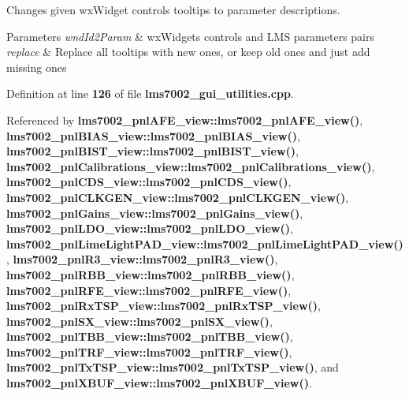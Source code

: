 Changes given wx\+Widget controls tooltips to parameter descriptions. 


\begin{DoxyParams}{Parameters}
{\em wnd\+Id2\+Param} & wx\+Widgets controls and L\+MS parameters pairs \\
\hline
{\em replace} & Replace all tooltips with new ones, or keep old ones and just add missing ones \\
\hline
\end{DoxyParams}


Definition at line {\bf 126} of file {\bf lms7002\+\_\+gui\+\_\+utilities.\+cpp}.



Referenced by {\bf lms7002\+\_\+pnl\+A\+F\+E\+\_\+view\+::lms7002\+\_\+pnl\+A\+F\+E\+\_\+view()}, {\bf lms7002\+\_\+pnl\+B\+I\+A\+S\+\_\+view\+::lms7002\+\_\+pnl\+B\+I\+A\+S\+\_\+view()}, {\bf lms7002\+\_\+pnl\+B\+I\+S\+T\+\_\+view\+::lms7002\+\_\+pnl\+B\+I\+S\+T\+\_\+view()}, {\bf lms7002\+\_\+pnl\+Calibrations\+\_\+view\+::lms7002\+\_\+pnl\+Calibrations\+\_\+view()}, {\bf lms7002\+\_\+pnl\+C\+D\+S\+\_\+view\+::lms7002\+\_\+pnl\+C\+D\+S\+\_\+view()}, {\bf lms7002\+\_\+pnl\+C\+L\+K\+G\+E\+N\+\_\+view\+::lms7002\+\_\+pnl\+C\+L\+K\+G\+E\+N\+\_\+view()}, {\bf lms7002\+\_\+pnl\+Gains\+\_\+view\+::lms7002\+\_\+pnl\+Gains\+\_\+view()}, {\bf lms7002\+\_\+pnl\+L\+D\+O\+\_\+view\+::lms7002\+\_\+pnl\+L\+D\+O\+\_\+view()}, {\bf lms7002\+\_\+pnl\+Lime\+Light\+P\+A\+D\+\_\+view\+::lms7002\+\_\+pnl\+Lime\+Light\+P\+A\+D\+\_\+view()}, {\bf lms7002\+\_\+pnl\+R3\+\_\+view\+::lms7002\+\_\+pnl\+R3\+\_\+view()}, {\bf lms7002\+\_\+pnl\+R\+B\+B\+\_\+view\+::lms7002\+\_\+pnl\+R\+B\+B\+\_\+view()}, {\bf lms7002\+\_\+pnl\+R\+F\+E\+\_\+view\+::lms7002\+\_\+pnl\+R\+F\+E\+\_\+view()}, {\bf lms7002\+\_\+pnl\+Rx\+T\+S\+P\+\_\+view\+::lms7002\+\_\+pnl\+Rx\+T\+S\+P\+\_\+view()}, {\bf lms7002\+\_\+pnl\+S\+X\+\_\+view\+::lms7002\+\_\+pnl\+S\+X\+\_\+view()}, {\bf lms7002\+\_\+pnl\+T\+B\+B\+\_\+view\+::lms7002\+\_\+pnl\+T\+B\+B\+\_\+view()}, {\bf lms7002\+\_\+pnl\+T\+R\+F\+\_\+view\+::lms7002\+\_\+pnl\+T\+R\+F\+\_\+view()}, {\bf lms7002\+\_\+pnl\+Tx\+T\+S\+P\+\_\+view\+::lms7002\+\_\+pnl\+Tx\+T\+S\+P\+\_\+view()}, and {\bf lms7002\+\_\+pnl\+X\+B\+U\+F\+\_\+view\+::lms7002\+\_\+pnl\+X\+B\+U\+F\+\_\+view()}.



